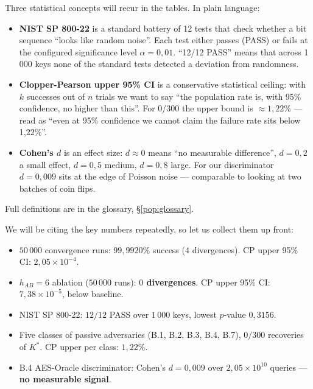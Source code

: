 \documentclass[11pt,a4paper]{article}
\begin{document}
\begin{tldr}
Three statistical concepts will recur in the tables. In plain language:
\begin{itemize}[leftmargin=*]
\item \textbf{NIST SP 800-22} is a standard battery of 12 tests that check whether a bit sequence ``looks like random noise''. Each test either passes (PASS) or fails at the configured significance level $\alpha = 0{,}01$. ``12/12 PASS'' means that across 1\,000 keys none of the standard tests detected a deviation from randomness.
\item \textbf{Clopper-Pearson upper 95\% CI} is a conservative statistical ceiling: with $k$ successes out of $n$ trials we want to say ``the population rate is, with 95\% confidence, no higher than this''. For 0/300 the upper bound is $\approx 1{,}22\%$ --- read as ``even at 95\% confidence we cannot claim the failure rate sits below 1{,}22\%''.
\item \textbf{Cohen's $d$} is an effect size: $d \approx 0$ means ``no measurable difference'', $d = 0{,}2$ a small effect, $d = 0{,}5$ medium, $d = 0{,}8$ large. For our discriminator $d = 0{,}009$ sits at the edge of Poisson noise --- comparable to looking at two batches of coin flips.
\end{itemize}
Full definitions are in the glossary, §\ref{pop:glossary}.
\end{tldr}

We will be citing the key numbers repeatedly, so let us collect them up front:

\begin{tldr}
\begin{itemize}[leftmargin=*]
\item $50\,000$ convergence runs: $99{,}9920\%$ success ($4$ divergences). CP upper 95\% CI: $2{,}05 \times 10^{-4}$.
\item $h_{AB}=6$ ablation ($50\,000$ runs): \textbf{$0$ divergences}. CP upper 95\% CI: $7{,}38 \times 10^{-5}$, below baseline.
\item NIST SP 800-22: $12/12$ PASS over $1\,000$ keys, lowest $p$-value $0{,}3156$.
\item Five classes of passive adversaries (B.1, B.2, B.3, B.4, B.7), $0/300$ recoveries of $K^*$. CP upper per class: $1{,}22\%$.
\item B.4 AES-Oracle discriminator: Cohen's $d = 0{,}009$ over $2{,}05 \times 10^{10}$ queries --- \textbf{no measurable signal}.
\end{itemize}
\end{tldr}
\end{document}
